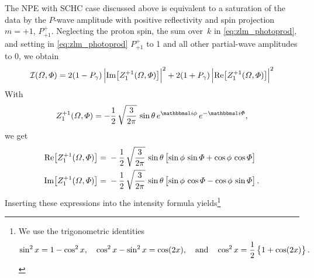 The NPE with SCHC case discussed above is equivalent to a saturation
of the data by the $P$-wave amplitude with positive reflectivity and
spin projection $m = +1$, \ie $P^+_{+1}$.  Neglecting the proton spin,
\ie the sum over~$k$ in \cref{eq:zlm_photoprod}, and setting in
\cref{eq:zlm_photoprod} $P^+_{+1}$ to 1 and all other partial-wave
amplitudes to 0, we obtain
\begin{equation}
  \mathcal{I}(\Omega, \Phi)
  = 2 (1 - P_\gamma)\, \Abs[2]{\Im[1]{Z_1^{+1}(\Omega, \Phi)}}^2
  + 2 (1 + P_\gamma)\, \Abs[2]{\Re[1]{Z_1^{+1}(\Omega, \Phi)}}^2
\end{equation}
With
\begin{equation}
  Z_1^{+1}(\Omega, \Phi)
  = -\frac{1}{2}\, \sqrt{\frac{3}{2 \pi}}\, \sin \theta\, e^{\imag \phi}\, e^{-\imag \Phi},
\end{equation}
we get
\begin{align}
  \Re[1]{Z_1^{+1}(\Omega, \Phi)}
  ={}& -\frac{1}{2}\, \sqrt{\frac{3}{2 \pi}}\, \sin \theta \sBrk[1]{\sin \phi\, \sin \Phi + \cos \phi\, \cos \Phi}
  \\
  \Im[1]{Z_1^{+1}(\Omega, \Phi)}
  ={}& -\frac{1}{2}\, \sqrt{\frac{3}{2 \pi}}\, \sin \theta \sBrk[1]{\sin \phi\, \cos \Phi - \cos \phi\, \sin \Phi}.
\end{align}
Inserting these expressions into the intensity formula yields\footnote{%
  We use the trigonometric identities
  \begin{equation}
    \sin^2 x
    = 1 - \cos^2 x,
    \quad
    \cos^2 x - \sin^2 x
    = \cos(2 x),
    \quad\text{and}\quad
    \cos^2 x
    = \frac{1}{2}\cBrk{1 + \cos(2 x)}.
  \end{equation}
}
